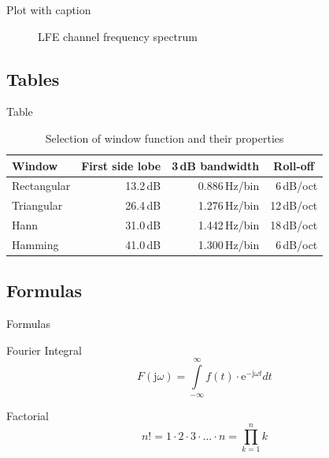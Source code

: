\documentclass[xcolor={svgnames},12pt,aspectratio=169,handout]{beamer}
\begin{document}
\begin{frame}{Plot with caption}
    \begin{figure}
        \centering
        \caption{LFE channel frequency spectrum}
    \end{figure}
\end{frame}

\subsection{Tables}

\begin{frame}{Table}
    \begin{table}[]
        \caption{Selection of window function and their properties}
        \begin{tabular}[]{lrrr}
            \toprule
            \textbf{Window}	& \multicolumn{1}{c}{\textbf{First side lobe}}
            & \multicolumn{1}{c}{\textbf{3\,dB bandwidth}}
            & \multicolumn{1}{c}{\textbf{Roll-off}} \\
            \midrule
            Rectangular				& 13.2\,dB	& 0.886\,Hz/bin	& 6\,dB/oct		\\[0.25em]
            Triangular				& 26.4\,dB	& 1.276\,Hz/bin	& 12\,dB/oct	\\[0.25em]
            Hann					& 31.0\,dB	& 1.442\,Hz/bin	& 18\,dB/oct	\\[0.25em]
            Hamming					& 41.0\,dB	& 1.300\,Hz/bin	& 6\,dB/oct		\\
            \bottomrule
        \end{tabular}
        \label{tab:WindowFunctions}
    \end{table}
\end{frame}

\subsection{Formulas}

\begin{frame}{Formulas}
    \begin{block}{Fourier Integral}
        \begin{equation*}
            F(\textrm{j}\omega) = \int\limits_{-\infty}^{\infty} f(t)\cdot\textrm{e}^{-\textrm{j}\omega t} dt
        \end{equation*}
    \end{block}

    \begin{block}{Factorial}
        \begin{equation*}
            n! = 1\cdot 2 \cdot 3 \cdot\ldots\cdot n = \prod_{k=1}^n k
        \end{equation*}
    \end{block}
\end{frame}
\end{document}
